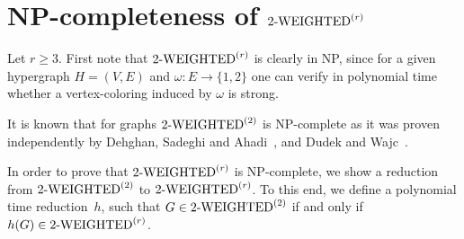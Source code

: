 \documentclass[12pt,reqno]{amsart}
\begin{document}

\section{NP-completeness of $\mbox{2-WEIGHTED}^{{(r)}}$}

Let $r\ge 3$. First note that $\mbox{2-WEIGHTED}^{{(r)}}$ is clearly in NP, since for a given hypergraph $H=(V,E)$ and $\omega:E\to\{1,2\}$ one can verify in polynomial time whether a vertex-coloring induced by $\omega$ is strong.

It is known that for graphs $\mbox{2-WEIGHTED}^{{(2)}}$ is NP-complete as it was proven independently by Dehghan, Sadeghi and Ahadi~\cite{NPcomplete2}, and Dudek and Wajc~\cite{NPcomplete}. 
 
In order to prove that $\mbox{2-WEIGHTED}^{{(r)}}$ is NP-complete, we show a reduction from $\mbox{2-WEIGHTED}^{{(2)}}$ to $\mbox{2-WEIGHTED}^{{(r)}}$. To this end, we define a polynomial time reduction~$h$, such that $G\in \mbox{2-WEIGHTED}^{{(2)}}$ if and only if $h(G)\in\mbox{2-WEIGHTED}^{{(r)}}$.
\end{document}
